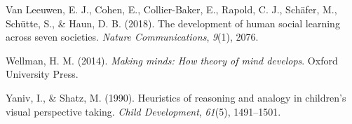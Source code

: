 \documentclass[
  man,floatsintext]{apa7}
\newlength{\cslhangindent}
\newlength{\cslentryspacingunit} %
\newenvironment{CSLReferences}[2] %
 {%
  \setlength{\parindent}{0pt}
  \ifodd #1
  \let\oldpar\par
  \def\par{\hangindent=\cslhangindent\oldpar}
  \fi
  \setlength{\parskip}{#2\cslentryspacingunit}
 }%
 {}
\begin{document}
\begin{CSLReferences}{1}{0}
\leavevmode{}%
Van Leeuwen, E. J., Cohen, E., Collier-Baker, E., Rapold, C. J., Schäfer, M., Schütte, S., \& Haun, D. B. (2018). The development of human social learning across seven societies. \emph{Nature Communications}, \emph{9}(1), 2076.

\leavevmode{}%
Wellman, H. M. (2014). \emph{Making minds: How theory of mind develops}. Oxford University Press.

\leavevmode{}%
Yaniv, I., \& Shatz, M. (1990). Heuristics of reasoning and analogy in children's visual perspective taking. \emph{Child Development}, \emph{61}(5), 1491--1501.

\end{CSLReferences}
\end{document}
